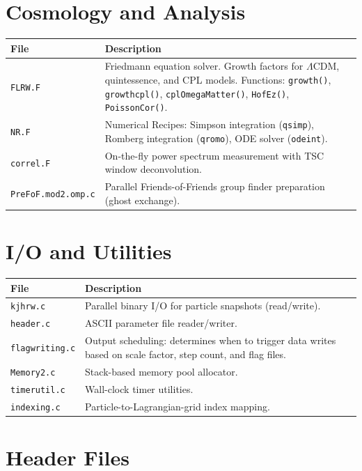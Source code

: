 \documentclass[11pt,fleqn]{book}
\newcommand{\code}[1]{\texttt{#1}}
\newcommand{\file}[1]{\texttt{#1}}
\begin{document}
\section{Cosmology and Analysis}

\begin{longtable}{L{5cm} L{8.5cm}}
\toprule
\textbf{File} & \textbf{Description} \\
\midrule
\endhead
\file{FLRW.F} & Friedmann equation solver.  Growth factors for $\Lambda$CDM, quintessence, and CPL models.  Functions: \code{growth()}, \code{growthcpl()}, \code{cplOmegaMatter()}, \code{HofEz()}, \code{PoissonCor()}. \\
\file{NR.F} & Numerical Recipes: Simpson integration (\code{qsimp}), Romberg integration (\code{qromo}), ODE solver (\code{odeint}). \\
\file{correl.F} & On-the-fly power spectrum measurement with TSC window deconvolution. \\
\file{PreFoF.mod2.omp.c} & Parallel Friends-of-Friends group finder preparation (ghost exchange). \\
\bottomrule
\end{longtable}

\section{I/O and Utilities}

\begin{longtable}{L{5cm} L{8.5cm}}
\toprule
\textbf{File} & \textbf{Description} \\
\midrule
\endhead
\file{kjhrw.c} & Parallel binary I/O for particle snapshots (read/write). \\
\file{header.c} & ASCII parameter file reader/writer. \\
\file{flagwriting.c} & Output scheduling: determines when to trigger data writes based on scale factor, step count, and flag files. \\
\file{Memory2.c} & Stack-based memory pool allocator. \\
\file{timerutil.c} & Wall-clock timer utilities. \\
\file{indexing.c} & Particle-to-Lagrangian-grid index mapping. \\
\bottomrule
\end{longtable}

\section{Header Files}
\end{document}
